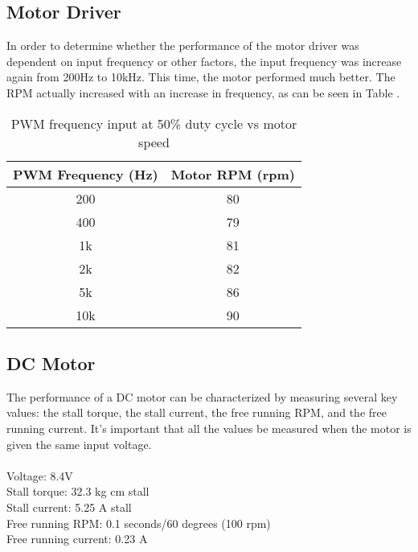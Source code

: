 \subsection{Motor Driver}
In order to determine whether the performance of the motor driver was dependent on input frequency or other factors, the input frequency was increase again from 200Hz to 10kHz. This time, the motor performed much better. The RPM actually increased with an increase in frequency, as can be seen in Table .
\begin{table}[H]
	\centering
	\caption{PWM frequency input at 50\% duty cycle vs motor speed}
	\begin{tabular}{| c | c |}
		\hline
		PWM Frequency (Hz) & Motor RPM (rpm) \\
		\hline
		200 & 80 \\
		400 & 79 \\
		1k & 81 \\
		2k & 82 \\
		5k & 86 \\
		10k & 90 \\
		\hline
	\end{tabular}
	\label{tbl:freq-test}
\end{table}

\subsection{DC Motor}

The performance of a DC motor can be characterized by measuring several key values: the stall torque, the stall current, the free running RPM, and the free running current. It's important that all the values be measured when the motor is given the same input voltage.\\
\\
\noindent
Voltage: 8.4V \\
Stall torque: 32.3 kg cm stall \\
Stall current: 5.25 A stall \\
Free running RPM: 0.1 seconds/60 degrees (100 rpm) \\
Free running current: 0.23 A \\



